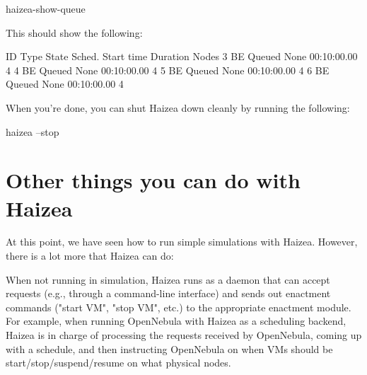 \begin{shellverbatim}
haizea-show-queue
\end{shellverbatim}

This should show the following:

\begin{wideshellverbatim}
 ID   Type  State      Sched. Start time       Duration      Nodes  
 3    BE    Queued     None                    00:10:00.00   4       
 4    BE    Queued     None                    00:10:00.00   4       
 5    BE    Queued     None                    00:10:00.00   4       
 6    BE    Queued     None                    00:10:00.00   4       
\end{wideshellverbatim}

When you're done, you can shut Haizea down cleanly by running the following:

\begin{shellverbatim}
haizea --stop
\end{shellverbatim}


\section{Other things you can do with Haizea}

At this point, we have seen how to run simple simulations with Haizea. However, there is a lot more that Haizea can do:

When not running in simulation, Haizea runs as a daemon that can accept requests (e.g., through a command-line interface) and sends out enactment commands ("start VM", "stop VM", etc.) to the appropriate enactment module. For example, when running OpenNebula with Haizea as a scheduling backend, Haizea is in charge of processing the requests received by OpenNebula, coming up with a schedule, and then instructing OpenNebula on when VMs should be start/stop/suspend/resume on what physical nodes.

